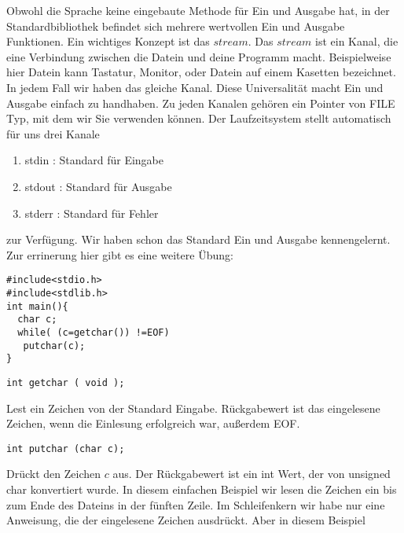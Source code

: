 \documentclass{article}[12pt]
\newenvironment{myexampleblock}[1]{%
    \tcolorbox[beamer,%
    noparskip,breakable,
    colback=White,colframe=ForestGreen,%
    colbacklower=LimeGreen!75!White,%
    title=#1]}%
    {\endtcolorbox}
\newenvironment{myexampleprogram}[1]{%
    \tcolorbox[beamer,%
    noparskip,breakable,
    colback=White,colframe=Goldenrod,%
    colbacklower=Yellow!75!White,%
    title=#1]}%
    {\endtcolorbox}
\begin{document}
Obwohl die Sprache keine eingebaute Methode für Ein und Ausgabe hat, in der Standardbibliothek befindet sich
mehrere wertvollen Ein und Ausgabe Funktionen. Ein wichtiges Konzept ist das $stream$. Das $stream$ ist ein Kanal, die
eine Verbindung zwischen die Datein und deine Programm macht. Beispielweise hier Datein kann  Tastatur, 
Monitor, oder Datein auf einem Kasetten bezeichnet. In jedem Fall wir haben das gleiche Kanal.
Diese Universalität macht Ein und Ausgabe einfach zu handhaben. Zu jeden Kanalen gehören ein Pointer von FILE Typ,
mit dem wir Sie verwenden können. Der Laufzeitsystem stellt automatisch für uns drei Kanale
\begin{enumerate}
\item stdin : Standard für Eingabe 
\item stdout : Standard für Ausgabe
\item stderr : Standard für Fehler
\end{enumerate} zur Verfügung. Wir haben schon das Standard Ein und Ausgabe kennengelernt. Zur errinerung hier gibt es
eine weitere Übung:
\begin{myexampleprogram}{Programme: \texttt{Eingabe nach Ausgabe Kopieren}}
\begin{lstlisting}
#include<stdio.h>
#include<stdlib.h>
int main(){
  char c;
  while( (c=getchar()) !=EOF)
   putchar(c);
}
\end{lstlisting}
\end{myexampleprogram}
\begin{myexampleblock}{Funktion: \texttt{getchar}}
\begin{lstlisting}
int getchar ( void );
\end{lstlisting}
\vspace{-0.4cm}
Lest ein Zeichen von der Standard Eingabe. Rückgabewert ist das eingelesene Zeichen, wenn die Einlesung erfolgreich war, außerdem
EOF.
\end{myexampleblock}
\begin{myexampleblock}{Funktion: \texttt{putchar}}
\begin{lstlisting}
int putchar (char c);
\end{lstlisting}
\vspace{-0.4cm}
Drückt den Zeichen $c$ aus. Der Rückgabewert ist ein int Wert, der von unsigned char konvertiert wurde.
\end{myexampleblock}
In diesem einfachen Beispiel wir lesen die Zeichen ein bis zum Ende des Dateins in der fünften Zeile.
Im Schleifenkern wir habe nur eine Anweisung, die der eingelesene Zeichen ausdrückt. Aber in diesem Beispiel
\end{document}
